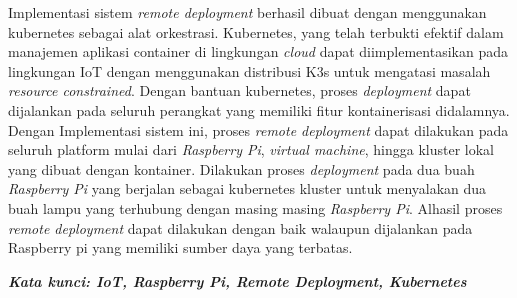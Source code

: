 \begin{singlespace}
  Implementasi sistem \textit{remote deployment} berhasil dibuat dengan menggunakan kubernetes sebagai alat orkestrasi. Kubernetes, yang telah terbukti efektif dalam manajemen aplikasi container di lingkungan \textit{cloud} dapat diimplementasikan pada lingkungan IoT dengan menggunakan distribusi K3s untuk mengatasi masalah \textit{resource constrained}. Dengan bantuan kubernetes, proses \textit{deployment} dapat dijalankan pada seluruh perangkat yang memiliki fitur kontainerisasi didalamnya. Dengan Implementasi sistem ini, proses \textit{remote deployment} dapat dilakukan pada seluruh platform mulai dari \textit{Raspberry Pi}, \textit{virtual machine}, hingga kluster lokal yang dibuat dengan kontainer. Dilakukan proses \textit{deployment} pada dua buah \textit{Raspberry Pi} yang berjalan sebagai kubernetes kluster untuk menyalakan dua buah lampu yang terhubung dengan masing masing \textit{Raspberry Pi}. Alhasil proses \textit{remote deployment} dapat dilakukan dengan baik walaupun dijalankan pada Raspberry pi yang memiliki sumber daya yang terbatas.
  
  \textbf{\textit{Kata kunci: IoT, Raspberry Pi, Remote Deployment, Kubernetes }}
  
\end{singlespace}
\clearpage